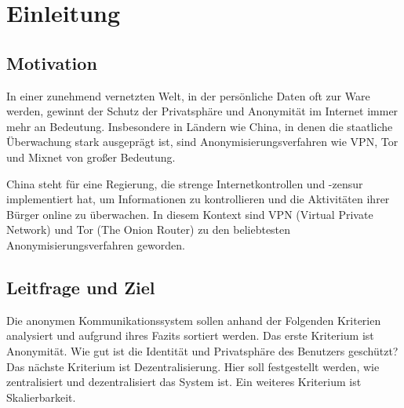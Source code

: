 \section{Einleitung}

\subsection{Motivation}

In einer zunehmend vernetzten Welt, in der persönliche Daten oft zur Ware werden, gewinnt der Schutz der Privatsphäre und Anonymität im Internet immer mehr an Bedeutung. Insbesondere in Ländern wie China, in denen die staatliche Überwachung stark ausgeprägt ist, sind Anonymisierungsverfahren wie VPN, Tor und Mixnet von großer Bedeutung.

China steht für eine Regierung, die strenge Internetkontrollen und -zensur implementiert hat, um Informationen zu kontrollieren und die Aktivitäten ihrer Bürger online zu überwachen. In diesem Kontext sind VPN (Virtual Private Network) und Tor (The Onion Router) zu den beliebtesten Anonymisierungsverfahren geworden.

\subsection{Leitfrage und Ziel}

Die anonymen Kommunikationssystem sollen anhand der Folgenden Kriterien analysiert und aufgrund ihres Fazits sortiert werden. Das erste Kriterium ist Anonymität. Wie gut ist die Identität und Privatsphäre des Benutzers geschützt? Das nächste Kriterium ist Dezentralisierung. Hier soll festgestellt werden, wie zentralisiert und dezentralisiert das System ist. Ein weiteres Kriterium ist Skalierbarkeit.